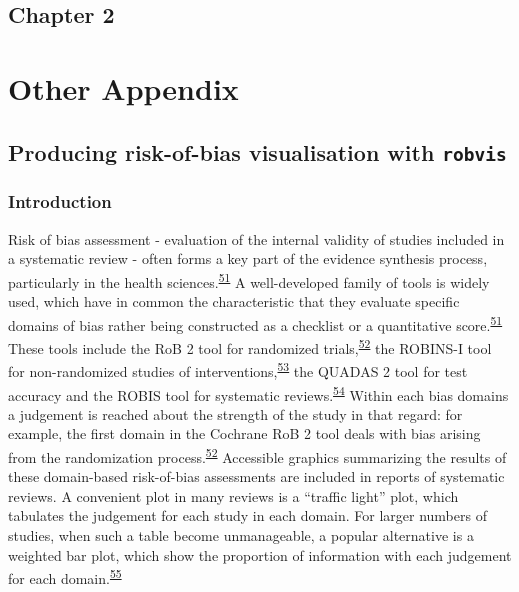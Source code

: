 \documentclass[a4paper, twoside]{templates/ociamthesis}
\begin{document}
\hypertarget{chapter-2}{%
\section{Chapter 2}\label{chapter-2}}

\hypertarget{other-appendix}{%
\chapter{Other Appendix}\label{other-appendix}}

\hypertarget{producing-risk-of-bias-visualisation-with-robvis}{%
\section{\texorpdfstring{Producing risk-of-bias visualisation with \texttt{robvis}}{Producing risk-of-bias visualisation with robvis}}\label{producing-risk-of-bias-visualisation-with-robvis}}

\hypertarget{introduction-1}{%
\subsection{Introduction}\label{introduction-1}}

Risk of bias assessment - evaluation of the internal validity of studies included in a systematic review - often forms a key part of the evidence synthesis process, particularly in the health sciences.\textsuperscript{\protect\hyperlink{ref-cochranechpt7}{51}} A well-developed family of tools is widely used, which have in common the characteristic that they evaluate specific domains of bias rather being constructed as a checklist or a quantitative score.\textsuperscript{\protect\hyperlink{ref-cochranechpt7}{51}} These tools include the RoB 2 tool for randomized trials,\textsuperscript{\protect\hyperlink{ref-sterne2019rob}{52}} the ROBINS-I tool for non-randomized studies of interventions,\textsuperscript{\protect\hyperlink{ref-sterne2016robins}{53}} the QUADAS 2 tool for test accuracy and the ROBIS tool for systematic reviews.\textsuperscript{\protect\hyperlink{ref-whiting2011quadas}{54}} Within each bias domains a judgement is reached about the strength of the study in that regard: for example, the first domain in the Cochrane RoB 2 tool deals with bias arising from the randomization process.\textsuperscript{\protect\hyperlink{ref-sterne2019rob}{52}} Accessible graphics summarizing the results of these domain-based risk-of-bias assessments are included in reports of systematic reviews. A convenient plot in many reviews is a ``traffic light'' plot, which tabulates the judgement for each study in each domain. For larger numbers of studies, when such a table become unmanageable, a popular alternative is a weighted bar plot, which show the proportion of information with each judgement for each domain.\textsuperscript{\protect\hyperlink{ref-higgins2008assessing}{55}}
\end{document}
